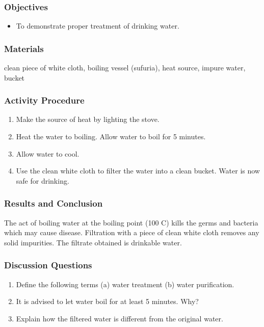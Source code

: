 \subsubsection*{Objectives}
\begin{itemize}
\item{To demonstrate proper treatment of drinking water.}
\end{itemize}

\subsubsection*{Materials}
clean piece of white cloth, boiling vessel (sufuria), heat source, impure water, bucket

\subsubsection*{Activity Procedure}
\begin{enumerate}
\item{Make the source of heat by lighting the stove.}
\item{Heat the water to boiling. Allow water to boil for 5 minutes.}
\item{Allow water to cool.}
\item{Use the clean white cloth to filter the water into a clean bucket. Water is now safe for drinking.}
\end{enumerate}

\subsubsection*{Results and Conclusion}
The act of boiling water at the boiling point (100 C) kills the germs and bacteria which may cause disease. Filtration with a piece of clean white cloth removes any solid impurities. The filtrate obtained is drinkable water.

\subsubsection*{Discussion Questions}
\begin{enumerate}
\item{Define the following terms (a) water treatment (b) water purification.}
\item{It is advised to let water boil for at least 5 minutes. Why?}
\item{Explain how the filtered water is different from the original water.}
\end{enumerate}

